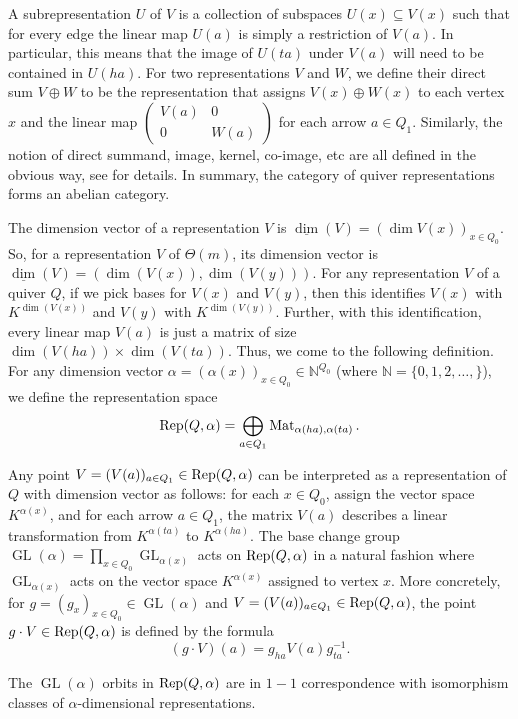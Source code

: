 \documentclass[11pt]{amsart}
\theoremstyle{definition}
\newcommand{\Rep}{{\rm Rep}}
\newcommand{\N}{{\mathbb N}}
\newcommand{\Mat}{\operatorname{Mat}}
\newcommand{\GL}{\operatorname{GL}}
\begin{document}
A subrepresentation $U$ of $V$ is a collection of subspaces $U(x) \subseteq V(x)$ such that for every edge the linear map $U(a)$ is simply a restriction of $V(a)$. In particular, this means that the image of $U(ta)$ under $V(a)$ will need to be contained in $U(ha)$. For two representations $V$ and $W$, we define their direct sum $V \oplus W$ to be the representation that assigns $V(x) \oplus W(x)$ to each vertex $x$ and the linear map $\begin{pmatrix} V(a) & 0 \\ 0 & W(a) \end{pmatrix}$ for each arrow $a \in Q_1$. Similarly, the notion of direct summand, image, kernel, co-image, etc are all defined in the obvious way, see \cite{DW-book} for details. In summary, the category of quiver representations forms an abelian category.


The dimension vector of a representation $V$ is $\underline{\dim}(V) = (\dim V(x))_{x \in Q_0}$. So, for a representation $V$ of $\Theta(m)$, its dimension vector is $\underline{\dim}(V) = (\dim(V(x)), \dim(V(y)))$.  
For any representation $V$ of a quiver $Q$, if we pick bases for $V(x)$ and $V(y)$, then this identifies $V(x)$ with $K^{\dim(V(x))}$ and $V(y)$ with $K^{\dim(V(y))}$. Further, with this identification, every linear map $V(a)$ is just a matrix of size $\dim(V(ha)) \times \dim(V(ta))$. Thus, we come to the following definition. For any dimension vector $\alpha = (\alpha(x))_{x \in Q_0} \in \N^{Q_0}$ (where $\N = \{0,1,2,\dots,\}$), we define the representation space
$$
\Rep(Q,\alpha) = \bigoplus_{a \in Q_1} \Mat_{\alpha(ha),\alpha(ta)}.
$$

Any point $V= (V(a))_{a \in Q_1} \in \Rep(Q,\alpha)$ can be interpreted as a representation of $Q$ with dimension vector as follows: for each $x \in Q_0$, assign the vector space $K^{\alpha(x)}$, and for each arrow $a \in Q_1$, the matrix $V(a)$ describes a linear transformation from $K^{\alpha(ta)}$ to $K^{\alpha(ha)}$. The base change group $\GL(\alpha) = \prod_{x \in Q_0} \GL_{\alpha(x)}$ acts on $\Rep(Q,\alpha)$ in a natural fashion where $\GL_{\alpha(x)}$ acts on the vector space $K^{\alpha(x)}$ assigned to vertex $x$. More concretely, for $g = (g_x)_{x \in Q_0} \in \GL(\alpha)$ and $V = (V(a))_{a \in Q_1} \in \Rep(Q,\alpha)$, the point $g \cdot V \in \Rep(Q,\alpha)$ is defined by the formula
$$
(g \cdot V) (a) = g_{ha} V(a) g_{ta}^{-1}.
$$

The $\GL(\alpha)$ orbits in $\Rep(Q,\alpha)$ are in $1-1$ correspondence with isomorphism classes of $\alpha$-dimensional representations.
\end{document}
